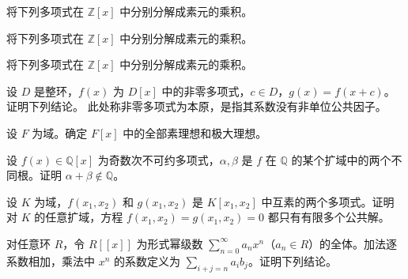\noindent\begin{minipage}{\textwidth}
将下列多项式在 $\mathbb{Z}[x]$ 中分别分解成素元的乘积。
\end{minipage}\par\vfill
\newpage
\noindent\begin{minipage}{\textwidth}
将下列多项式在 $\mathbb{Z}[x]$ 中分别分解成素元的乘积。
\end{minipage}\par\vfill
\noindent\begin{minipage}{\textwidth}
将下列多项式在 $\mathbb{Z}[x]$ 中分别分解成素元的乘积。
\end{minipage}\par\vfill
\noindent\begin{minipage}{\textwidth}
设 $D$ 是整环，$f(x)$ 为 $D[x]$ 中的非零多项式，$c\in D$，$g(x)=f(x+c)$。证明下列结论。 此处称非零多项式为本原，是指其系数没有非单位公共因子。
\end{minipage}\par\vfill
\newpage
\noindent\begin{minipage}{\textwidth}
设 $F$ 为域。确定 $F[x]$ 中的全部素理想和极大理想。
\end{minipage}\par\vfill
\noindent\begin{minipage}{\textwidth}
设 $f(x)\in\mathbb{Q}[x]$ 为奇数次不可约多项式，$\alpha,\beta$ 是 $f$ 在 $\mathbb{Q}$ 的某个扩域中的两个不同根。证明 $\alpha+\beta\notin\mathbb{Q}$。
\end{minipage}\par\vfill
\noindent\begin{minipage}{\textwidth}
设 $K$ 为域，$f(x_1,x_2)$ 和 $g(x_1,x_2)$ 是 $K[x_1,x_2]$ 中互素的两个多项式。证明对 $K$ 的任意扩域，方程 $f(x_1,x_2)=g(x_1,x_2)=0$ 都只有有限多个公共解。
\end{minipage}\par\vfill
\newpage
\noindent\begin{minipage}{\textwidth}
对任意环 $R$，令 $R[[x]]$ 为形式幂级数 $\sum_{n=0}^{\infty}a_nx^n$（$a_n\in R$）的全体。加法逐系数相加，乘法中 $x^n$ 的系数定义为 $\sum_{i+j=n}a_i b_j$。证明下列结论。
\end{minipage}\par\vfill
